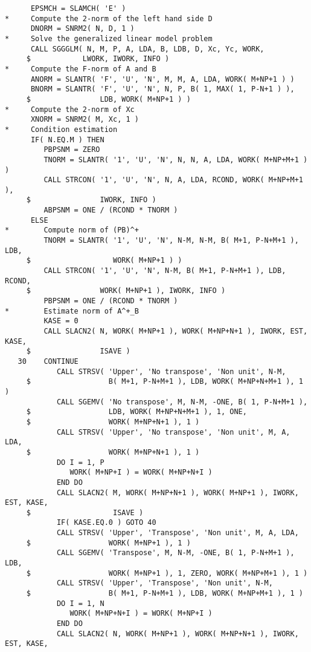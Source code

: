 {\small
\begin{verbatim}
      EPSMCH = SLAMCH( 'E' )
*     Compute the 2-norm of the left hand side D
      DNORM = SNRM2( N, D, 1 )
*     Solve the generalized linear model problem
      CALL SGGGLM( N, M, P, A, LDA, B, LDB, D, Xc, Yc, WORK,
     $            LWORK, IWORK, INFO )
*     Compute the F-norm of A and B
      ANORM = SLANTR( 'F', 'U', 'N', M, M, A, LDA, WORK( M+NP+1 ) )
      BNORM = SLANTR( 'F', 'U', 'N', N, P, B( 1, MAX( 1, P-N+1 ) ),
     $                LDB, WORK( M+NP+1 ) )
*     Compute the 2-norm of Xc
      XNORM = SNRM2( M, Xc, 1 )
*     Condition estimation
      IF( N.EQ.M ) THEN
         PBPSNM = ZERO
         TNORM = SLANTR( '1', 'U', 'N', N, N, A, LDA, WORK( M+NP+M+1 ) )
         CALL STRCON( '1', 'U', 'N', N, A, LDA, RCOND, WORK( M+NP+M+1 ),
     $                IWORK, INFO )
         ABPSNM = ONE / (RCOND * TNORM )
      ELSE
*        Compute norm of (PB)^+
         TNORM = SLANTR( '1', 'U', 'N', N-M, N-M, B( M+1, P-N+M+1 ), LDB,
     $                   WORK( M+NP+1 ) )
         CALL STRCON( '1', 'U', 'N', N-M, B( M+1, P-N+M+1 ), LDB, RCOND,
     $                WORK( M+NP+1 ), IWORK, INFO )
         PBPSNM = ONE / (RCOND * TNORM )
*        Estimate norm of A^+_B
         KASE = 0
         CALL SLACN2( N, WORK( M+NP+1 ), WORK( M+NP+N+1 ), IWORK, EST, KASE,
     $                ISAVE )
   30    CONTINUE
            CALL STRSV( 'Upper', 'No transpose', 'Non unit', N-M,
     $                  B( M+1, P-N+M+1 ), LDB, WORK( M+NP+N+M+1 ), 1 )
            CALL SGEMV( 'No transpose', M, N-M, -ONE, B( 1, P-N+M+1 ),
     $                  LDB, WORK( M+NP+N+M+1 ), 1, ONE,
     $                  WORK( M+NP+N+1 ), 1 )
            CALL STRSV( 'Upper', 'No transpose', 'Non unit', M, A, LDA,
     $                  WORK( M+NP+N+1 ), 1 )
            DO I = 1, P
               WORK( M+NP+I ) = WORK( M+NP+N+I )
            END DO
            CALL SLACN2( M, WORK( M+NP+N+1 ), WORK( M+NP+1 ), IWORK, EST, KASE,
     $                   ISAVE )
            IF( KASE.EQ.0 ) GOTO 40
            CALL STRSV( 'Upper', 'Transpose', 'Non unit', M, A, LDA,
     $                  WORK( M+NP+1 ), 1 )
            CALL SGEMV( 'Transpose', M, N-M, -ONE, B( 1, P-N+M+1 ), LDB,
     $                  WORK( M+NP+1 ), 1, ZERO, WORK( M+NP+M+1 ), 1 )
            CALL STRSV( 'Upper', 'Transpose', 'Non unit', N-M,
     $                  B( M+1, P-N+M+1 ), LDB, WORK( M+NP+M+1 ), 1 )
            DO I = 1, N
               WORK( M+NP+N+I ) = WORK( M+NP+I )
            END DO
            CALL SLACN2( N, WORK( M+NP+1 ), WORK( M+NP+N+1 ), IWORK, EST, KASE,

\end{verbatim}}
